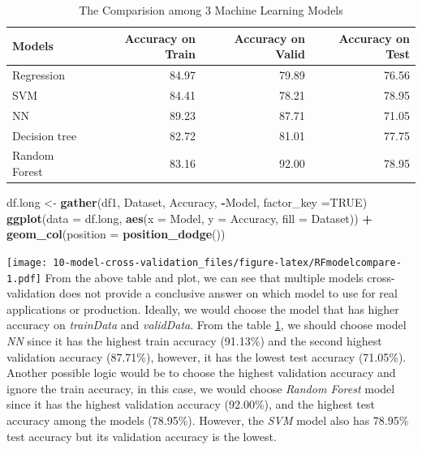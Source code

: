 \documentclass[
]{book}
\newenvironment{Shaded}{\begin{snugshade}}{\end{snugshade}}
\newcommand{\DataTypeTok}[1]{\textcolor[rgb]{0.13,0.29,0.53}{#1}}
\newcommand{\KeywordTok}[1]{\textcolor[rgb]{0.13,0.29,0.53}{\textbf{#1}}}
\newcommand{\NormalTok}[1]{#1}
\newcommand{\OperatorTok}[1]{\textcolor[rgb]{0.81,0.36,0.00}{\textbf{#1}}}
\newcommand{\OtherTok}[1]{\textcolor[rgb]{0.56,0.35,0.01}{#1}}
\newcommand{\StringTok}[1]{\textcolor[rgb]{0.31,0.60,0.02}{#1}}
\begin{document}
\begin{longtable}[t]{lrrr}
\caption{\label{tab:Tabmodelcompare}The Comparision among 3 Machine Learning Models}\\
\toprule
Models & Accuracy on Train & Accuracy on Valid & Accuracy on Test\\
\midrule
Regression & 84.97 & 79.89 & 76.56\\
SVM & 84.41 & 78.21 & 78.95\\
NN & 89.23 & 87.71 & 71.05\\
Decision tree & 82.72 & 81.01 & 77.75\\
Random Forest & 83.16 & 92.00 & 78.95\\
\bottomrule
\end{longtable}

\begin{Shaded}
\begin{Highlighting}[]
\NormalTok{df.long <-}\StringTok{ }\KeywordTok{gather}\NormalTok{(df1, Dataset, Accuracy, }\OperatorTok{-}\NormalTok{Model, }\DataTypeTok{factor_key =}\OtherTok{TRUE}\NormalTok{)}
\KeywordTok{ggplot}\NormalTok{(}\DataTypeTok{data =}\NormalTok{ df.long, }\KeywordTok{aes}\NormalTok{(}\DataTypeTok{x =}\NormalTok{ Model, }\DataTypeTok{y =}\NormalTok{ Accuracy, }\DataTypeTok{fill =}\NormalTok{ Dataset)) }\OperatorTok{+}
\StringTok{  }\KeywordTok{geom_col}\NormalTok{(}\DataTypeTok{position =} \KeywordTok{position_dodge}\NormalTok{()) }
\end{Highlighting}
\end{Shaded}

\texttt{[image: 10-model-cross-validation\_files/figure-latex/RFmodelcompare-1.pdf]}
From the above table and plot, we can see that multiple models cross-validation does not provide a conclusive answer on which model to use for real applications or production. Ideally, we would choose the model that has higher accuracy on \emph{trainData} and \emph{validData}. From the table \ref{tab:Tabmodelcompare}, we should choose model \emph{NN} since it has the highest train accuracy (91.13\%) and the second highest validation accuracy (87.71\%), however, it has the lowest test accuracy (71.05\%). Another possible logic would be to choose the highest validation accuracy and ignore the train accuracy, in this case, we would choose \emph{Random Forest} model since it has the highest validation accuracy (92.00\%), and the highest test accuracy among the models (78.95\%). However, the \emph{SVM} model also has 78.95\% test accuracy but its validation accuracy is the lowest.
\end{document}
